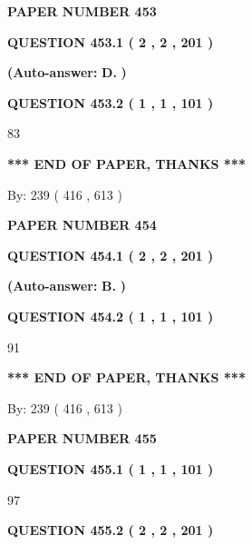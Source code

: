 \documentclass[12pt]{article}
\begin{document}
   
\newpage 
\setcounter{page}{ 
   453001 } 
   
   
 {\textbf{ \Large{ PAPER NUMBER  453  }}}
   
   
   
   
  
  
{\textbf{\large{QUESTION
453.1 
 ( 2 , 2 , 201 )
}}}
 
 
{\textbf{(Auto-answer:}}
{\textbf{\large{
D.}}}
{\textbf{)}}
 
 
  
  
{\textbf{\large{QUESTION
453.2 
 ( 1 , 1 , 101 )
}}}

83
   
   
   
   
\vspace{1.0in} 
{\textbf{\large{ *** END OF PAPER, THANKS *** }}} 
   
   
\hspace{1.0in} By: 
 239 ( 416 ,  613 )
   
   
   
   
\newpage 
\setcounter{page}{ 
   454001 } 
   
   
 {\textbf{ \Large{ PAPER NUMBER  454  }}}
   
   
   
   
  
  
{\textbf{\large{QUESTION
454.1 
 ( 2 , 2 , 201 )
}}}
 
 
{\textbf{(Auto-answer:}}
{\textbf{\large{
B.}}}
{\textbf{)}}
 
 
  
  
{\textbf{\large{QUESTION
454.2 
 ( 1 , 1 , 101 )
}}}

91
   
   
   
   
\vspace{1.0in} 
{\textbf{\large{ *** END OF PAPER, THANKS *** }}} 
   
   
\hspace{1.0in} By: 
 239 ( 416 ,  613 )
   
   
   
   
\newpage 
\setcounter{page}{ 
   455001 } 
   
   
 {\textbf{ \Large{ PAPER NUMBER  455  }}}
   
   
   
   
  
  
{\textbf{\large{QUESTION
455.1 
 ( 1 , 1 , 101 )
}}}

97
  
  
{\textbf{\large{QUESTION
455.2 
 ( 2 , 2 , 201 )
}}}
 
\end{document}
